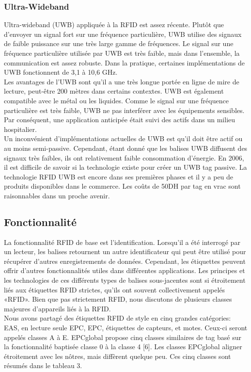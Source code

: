 \documentclass[11pt, a4paper, twoside]{book}
\begin{document}
\subsubsection{Ultra-Wideband}
Ultra-wideband (UWB) appliquée à la RFID est assez récente. Plutôt que d'envoyer un signal fort sur une fréquence particulière, UWB utilise des signaux de faible puissance sur une très large gamme de fréquences. Le signal sur une fréquence particulière utilisée par UWB est très faible, mais dans l'ensemble, la communication est assez robuste. Dans la pratique, certaines implémentations de UWB fonctionnent de 3,1 à 10,6 GHz.\\

Les avantages de l'UWB sont qu'il a une très longue portée en ligne de mire de lecture, peut-être 200 mètres dans certains contextes. UWB est également compatible avec le métal ou les liquides. Comme le signal sur une fréquence particulière est très faible, UWB ne pas interférer avec les équipements sensibles. Par conséquent, une application anticipée était suivi des actifs dans un milieu hospitalier.\\

Un inconvénient d'implémentations actuelles de UWB est qu'il doit être actif ou au moins semi-passive. Cependant, étant donné que les balises UWB diffusent des signaux très faibles, ils ont relativement faible consommation d'énergie. En 2006, il est difficile de savoir si la technologie existe pour créer un UWB tag passive.
La technologie RFID UWB est encore dans ses premières phases et il y a peu de produits disponibles dans le commerce. Les coûts de 50DH par tag en vrac sont raisonnables dans un proche avenir.
\subsection{Fonctionnalité}
La fonctionnalité RFID de base est l'identification. Lorsqu'il a été interrogé par un lecteur, les balises retournent un autre identificateur qui peut être utilisé pour récupérer d'autres enregistrements de données. Cependant, les étiquettes peuvent offrir d'autres fonctionnalités utiles dans différentes applications. Les principes et les technologies de ces différents types de balises sous-jacentes sont si étroitement liés aux étiquettes RFID strictes, qu'ils ont souvent collectivement appelés «RFID». Bien que pas strictement RFID, nous discutons de plusieurs classes majeures d'appareils liés à la RFID.\\

Nous avons partagé des étiquettes RFID de style en cinq grandes catégories: EAS, en lecture seule EPC, EPC, étiquettes de capteurs, et motes. Ceux-ci seront appelés classes A à E. EPCglobal propose cinq classes similaires de tag basé sur la fonctionnalité baptisée classe 0 à la classe 4 [6]. Les classes EPCglobal aligner étroitement avec les nôtres, mais diffèrent quelque peu. Ces cinq classes sont résumés dans le tableau 3.
\end{document}
